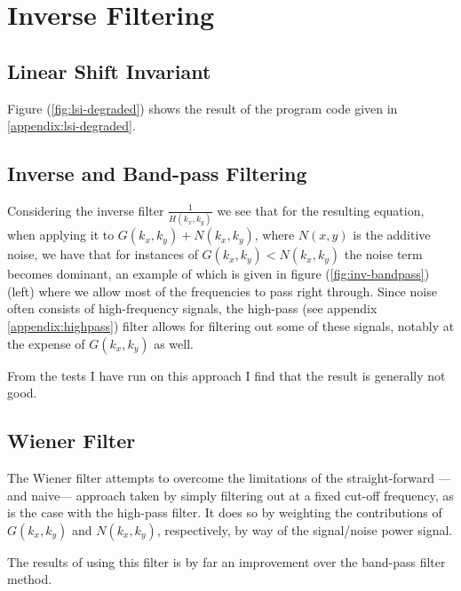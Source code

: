 %
%

\section{Inverse Filtering}

\subsection{Linear Shift Invariant}
\begin{multicols}{2}
\noindent
    Figure (\ref{fig:lsi-degraded}) shows the result of the program code
    given in \ref{appendix:lsi-degraded}.
    \vfill{\ }\columnbreak
\end{multicols}

\subsection{Inverse and Band-pass Filtering}
Considering the inverse filter $\frac{1}{H(k_x,k_y)}$ we see that for the
resulting equation, when applying it to $G(k_x,k_y) + N(k_x,k_y)$, where
$N(x,y)$ is the additive noise, we have that for instances of $G(k_x,k_y) <
N(k_x,k_y)$ the noise term becomes dominant, an example of which is given in
figure (\ref{fig:inv-bandpass}) (left) where we allow most of the frequencies
to pass right through. Since noise often consists of high-frequency signals,
the high-pass (see appendix \ref{appendix:highpass}) filter allows for
filtering out some of these signals, notably at the expense of $G(k_x,k_y)$ as
well.


From the tests I have run on this approach I find that the result is generally
not good.

\subsection{Wiener Filter}
The Wiener filter attempts to overcome the limitations of the straight-forward
---and naive--- approach taken by simply filtering out at a fixed cut-off
frequency, as is the case with the high-pass filter. It does so by weighting
the contributions of $G(k_x,k_y)$ and $N(k_x,k_y)$, respectively, by way of
the signal/noise power signal.


The results of using this filter is by far an improvement over the band-pass
filter method.
